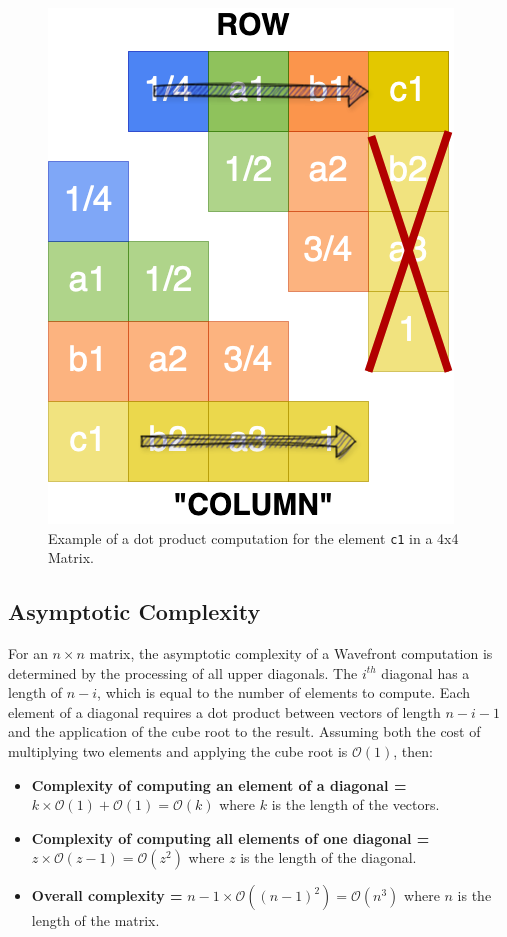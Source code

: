 \begin{figure}[h]
    \centering\includegraphics[scale=0.30]{img/Sequential Implementation/Locality_of_reference.drawio.png}
    
    \caption{Example of a dot product computation for the element \texttt{c1} in a 4x4 Matrix.}
\end{figure}

\subsection*{Asymptotic Complexity}
For an $n \times n$ matrix, the asymptotic complexity of a Wavefront computation is determined by the processing of all upper diagonals. The $i^{th}$ diagonal has a length of $n - i$, which is equal to the number of elements to compute. Each element of a diagonal requires a dot product between vectors of length $n - i - 1$ and the application of the cube root to the result. Assuming both the cost of multiplying two elements and applying the cube root is $\mathcal{O}(1)$, then:

\begin{itemize}
    \item \textbf{Complexity of computing an element of a diagonal = } $k \times \mathcal{O}(1) + \mathcal{O}(1) = \mathcal{O}(k)$ where $k$ is the length of the vectors. 

    \item \textbf{Complexity of computing all elements of one diagonal =} $z \times \mathcal{O}(z-1) = \mathcal{O}(z^{2})$ where $z$ is the length of the diagonal.

    \item \textbf{Overall complexity = } $n-1 \times \mathcal{O}((n-1)^{2}) = \mathcal{O}(n^{3})$ where $n$ is the length of the matrix.
\end{itemize}

